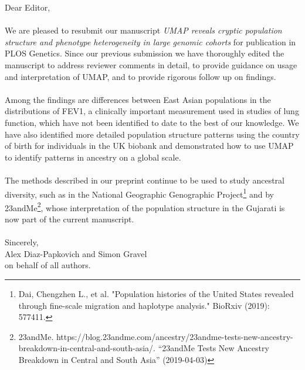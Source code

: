 \documentclass{article}
\begin{document}
Dear Editor,
\\\\
We are pleased to resubmit our manuscript \emph{UMAP reveals cryptic population structure and phenotype heterogeneity in large genomic cohorts} for publication in PLOS Genetics. Since our previous submission we have thoroughly edited the manuscript to address reviewer comments in detail, to provide guidance on usage and interpretation of UMAP, and to provide rigorous follow up on findings.
\\\\
Among the findings are differences between East Asian populations in the distributions of FEV1, a clinically important measurement used in studies of lung function, which have not been identified to date to the best of our knowledge. We have also identified more detailed population structure patterns using the country of birth for individuals in the UK biobank and demonstrated how to use UMAP to identify patterns in ancestry on a global scale.
\\\\
The methods described in our preprint continue to be used to study ancestral diversity, such as in the National Geographic Genographic Project\footnote{Dai, Chengzhen L., et al. "Population histories of the United States revealed through fine-scale migration and haplotype analysis." BioRxiv (2019): 577411.} and by 23andMe\footnote{23andMe. https://blog.23andme.com/ancestry/23andme-tests-new-ancestry-breakdown-in-central-and-south-asia/. ``23andMe Tests New Ancestry Breakdown in Central and South Asia'' (2019-04-03)}, whose interpretation of the population structure in the Gujarati is now part of the current manuscript. 
\\
\\
Sincerely,
\\
Alex Diaz-Papkovich and Simon Gravel
\\
on behalf of all authors.
\end{document}
